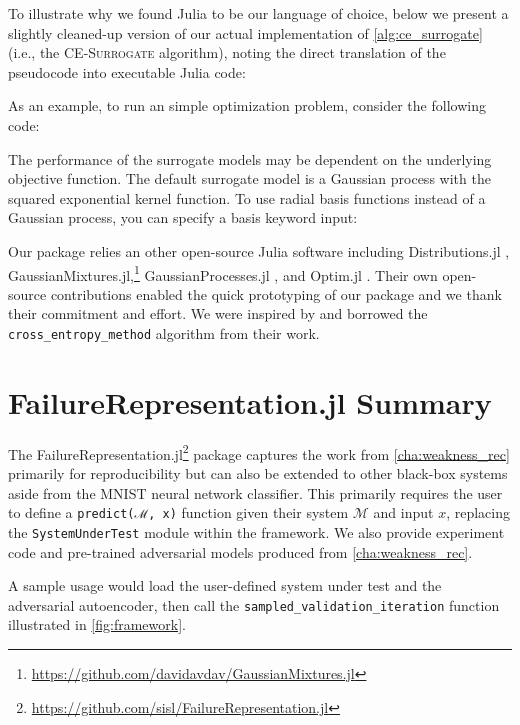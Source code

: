 

To illustrate why we found Julia to be our language of choice, below we present a slightly cleaned-up version of our actual implementation of \cref{alg:ce_surrogate} (i.e., the \textsc{CE-Surrogate} algorithm), noting the direct translation of the pseudocode into executable Julia code:



As an example, to run an simple optimization problem, consider the following code:


The performance of the surrogate models may be dependent on the underlying objective function. The default surrogate model is a Gaussian process with the squared exponential kernel function. To use radial basis functions instead of a Gaussian process, you can specify a basis keyword input:


Our package relies an other open-source Julia software including Distributions.jl \cite{distributions.jl}, GaussianMixtures.jl,\footnote{\url{https://github.com/davidavdav/GaussianMixtures.jl}} GaussianProcesses.jl \cite{gaussianprocesses.jl}, and Optim.jl \cite{mogensen2018optim}. Their own open-source contributions enabled the quick prototyping of our package and we thank their commitment and effort. We were inspired by  and borrowed the \texttt{cross\_entropy\_method} algorithm from their work.


\section{FailureRepresentation.jl Summary}
The FailureRepresentation.jl\footnote{\url{https://github.com/sisl/FailureRepresentation.jl}} package captures the work from \cref{cha:weakness_rec} primarily for reproducibility but can also be extended to other black-box systems aside from the MNIST neural network classifier.
This primarily requires the user to define a \texttt{predict(ℳ, x)} function given their system $\mathcal M$ and input $x$, replacing the \texttt{SystemUnderTest} module within the framework.
We also provide experiment code and pre-trained adversarial models produced from \cref{cha:weakness_rec}.

A sample usage would load the user-defined system under test and the adversarial autoencoder, then call the \texttt{sampled\_validation\_iteration} function illustrated in \cref{fig:framework}.

